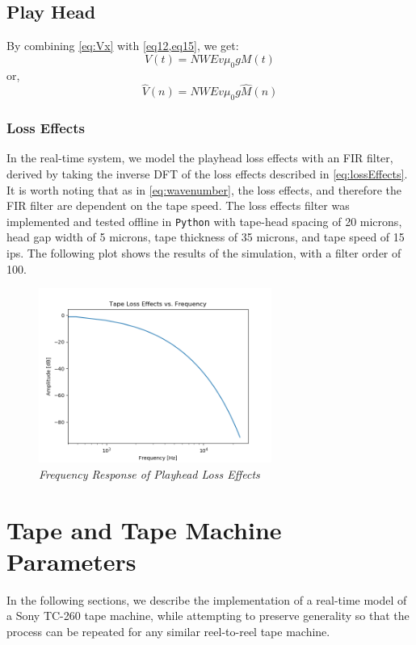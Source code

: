 \documentclass[twoside,a4paper]{article}
\begin{document}
\subsection{Play Head}
By combining \cref{eq:Vx} with \cref{eq12,eq15}, we get:
\begin{equation}
    V(t) =  NWEv \mu_0  g M(t)
\end{equation}
%
or,
\begin{equation}
    \hat{V}(n) =  NWEv \mu_0  g \hat{M}(n)
    \label{eq:Vout}
\end{equation}
%
\subsubsection{Loss Effects} \label{Loss_Effects}
In the real-time system, we model the playhead
loss effects with an FIR filter, derived by
taking the inverse DFT of the
loss effects described in \cref{eq:lossEffects}.
It is worth noting that as in \cref{eq:wavenumber},
the loss effects, and therefore the FIR filter
are dependent on the tape speed.
\newline\newline
The loss effects filter was implemented and
tested offline in \texttt{Python} with tape-head 
spacing of 20 microns, head gap width of 5 microns, 
tape thickness of 35 microns, and tape speed of 15 ips.
The following plot shows the results of the simulation,
with a filter order of 100.
\begin{figure}[ht]
    \center
    \includegraphics[width=3in]{../Simulations/LossEffects/Loss_Effects.png}
    \caption{\label{lossEffectsSim}{\it Frequency Response of Playhead Loss Effects}}
\end{figure}
%

\section{Tape and Tape Machine Parameters}
In the following sections, we describe the implementation of
a real-time model of a Sony TC-260 tape machine, while attempting
to preserve generality so that the process can be repeated for any
similar reel-to-reel tape machine.
\end{document}
